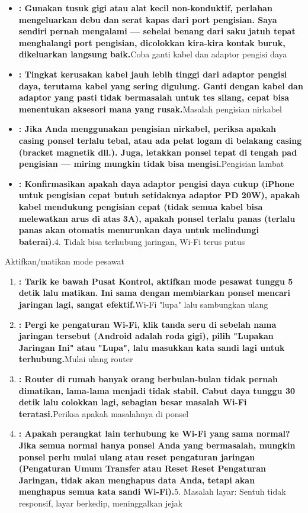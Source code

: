 \begin{itemize}
  \item \textbf{: Gunakan tusuk gigi atau alat kecil non-konduktif, perlahan mengeluarkan debu dan serat kapas dari port pengisian. Saya sendiri pernah mengalami — sehelai benang dari saku jatuh tepat menghalangi port pengisian, dicolokkan kira-kira kontak buruk, dikeluarkan langsung baik.}Coba ganti kabel dan adaptor pengisi daya
  \item \textbf{: Tingkat kerusakan kabel jauh lebih tinggi dari adaptor pengisi daya, terutama kabel yang sering digulung. Ganti dengan kabel dan adaptor yang pasti tidak bermasalah untuk tes silang, cepat bisa menentukan aksesori mana yang rusak.}Masalah pengisian nirkabel
  \item \textbf{: Jika Anda menggunakan pengisian nirkabel, periksa apakah casing ponsel terlalu tebal, atau ada pelat logam di belakang casing (bracket magnetik dll.). Juga, letakkan ponsel tepat di tengah pad pengisian — miring mungkin tidak bisa mengisi.}Pengisian lambat
  \item \textbf{: Konfirmasikan apakah daya adaptor pengisi daya cukup (iPhone untuk pengisian cepat butuh setidaknya adaptor PD 20W), apakah kabel mendukung pengisian cepat (tidak semua kabel bisa melewatkan arus di atas 3A), apakah ponsel terlalu panas (terlalu panas akan otomatis menurunkan daya untuk melindungi baterai).}4. Tidak bisa terhubung jaringan, Wi-Fi terus putus
\end{itemize}


Aktifkan/matikan mode pesawat

\begin{enumerate}
  \item \textbf{: Tarik ke bawah Pusat Kontrol, aktifkan mode pesawat tunggu 5 detik lalu matikan. Ini sama dengan membiarkan ponsel mencari jaringan lagi, sangat efektif.}Wi-Fi "lupa" lalu sambungkan ulang
  \item \textbf{: Pergi ke pengaturan Wi-Fi, klik tanda seru di sebelah nama jaringan tersebut (Android adalah roda gigi), pilih "Lupakan Jaringan Ini" atau "Lupa", lalu masukkan kata sandi lagi untuk terhubung.}Mulai ulang router
  \item \textbf{: Router di rumah banyak orang berbulan-bulan tidak pernah dimatikan, lama-lama menjadi tidak stabil. Cabut daya tunggu 30 detik lalu colokkan lagi, sebagian besar masalah Wi-Fi teratasi.}Periksa apakah masalahnya di ponsel
  \item \textbf{: Apakah perangkat lain terhubung ke Wi-Fi yang sama normal? Jika semua normal hanya ponsel Anda yang bermasalah, mungkin ponsel perlu mulai ulang atau reset pengaturan jaringan (Pengaturan Umum Transfer atau Reset Reset Pengaturan Jaringan, tidak akan menghapus data Anda, tetapi akan menghapus semua kata sandi Wi-Fi).}5. Masalah layar: Sentuh tidak responsif, layar berkedip, meninggalkan jejak
\end{enumerate}

